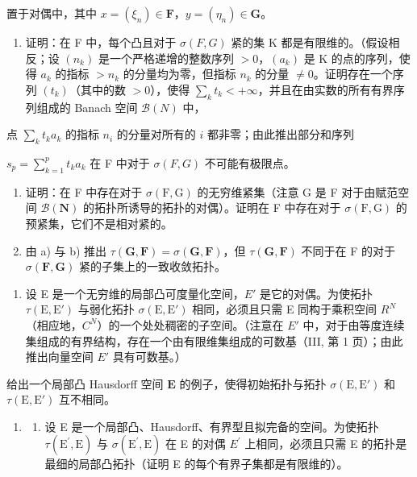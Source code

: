 置于对偶中，其中 \(x = (\xi_n)\in \mathbf{F}\)，\(y = (\eta_{n})\in \mathbf{G}\)。

\begin{enumerate}
\def\labelenumi{\alph{enumi})}
\tightlist
\item
  证明：在 F 中，每个凸且对于 \(\sigma(F, G)\) 紧的集 K 都是有限维的。（假设相反；设 \((n_k)\) 是一个严格递增的整数序列 \(>0\)，\((a_k)\) 是 K 的点的序列，使得 \(a_k\) 的指标 \(>n_k\) 的分量均为零，但指标 \(n_k\) 的分量 \(\neq 0\)。证明存在一个序列 \((t_k)\)（其中的数 \(>0\)），使得 \(\sum_{k} t_k < +\infty\)，并且在由实数的所有有界序列组成的 Banach 空间 \(\mathcal{B}(N)\) 中，
\end{enumerate}

点 \(\sum_{k} t_k a_k\) 的指标 \(n_i\) 的分量对所有的 \(i\) 都非零；由此推出部分和序列

\(s_{p} = \sum_{k=1}^{p} t_k a_k\) 在 F 中对于 \(\sigma(F, G)\) 不可能有极限点。

\begin{enumerate}
\def\labelenumi{\alph{enumi})}
\setcounter{enumi}{1}
\item
  证明：在 F 中存在对于 \(\sigma(\mathrm{F},\mathrm{G})\) 的无穷维紧集（注意 G 是 F 对于由赋范空间 \(\mathcal{B}(\mathbf{N})\) 的拓扑所诱导的拓扑的对偶）。证明在 F 中存在对于 \(\sigma(\mathrm{F},\mathrm{G})\) 的预紧集，它们不是相对紧的。
\item
  由 a) 与 b) 推出 \(\tau(\mathbf{G},\mathbf{F})=\sigma(\mathbf{G},\mathbf{F})\)，但 \(\tau(\mathbf{G},\mathbf{F})\) 不同于在 F 的对于 \(\sigma(\mathbf{F},\mathbf{G})\) 紧的子集上的一致收敛拓扑。
\end{enumerate}

\begin{enumerate}
\def\labelenumi{\arabic{enumi})}
\setcounter{enumi}{7}
\tightlist
\item
  设 E 是一个无穷维的局部凸可度量化空间，\(E'\) 是它的对偶。为使拓扑 \(\tau(\mathrm{E}, \mathrm{E}')\) 与弱化拓扑 \(\sigma(\mathrm{E}, \mathrm{E}')\) 相同，必须且只需 E 同构于乘积空间 \(R^{N}\)（相应地，\(C^{N}\)）的一个处处稠密的子空间。（注意在 \(E'\) 中，对于由等度连续集组成的有界结构，存在一个由有限维集组成的可数基（III, 第 1 页）；由此推出向量空间 \(E'\) 具有可数基。）
\end{enumerate}

给出一个局部凸 Hausdorff 空间 \(\mathbf{E}\) 的例子，使得初始拓扑与拓扑 \(\sigma(\mathrm{E},\mathrm{E}')\) 和 \(\tau(\mathrm{E},\mathrm{E}')\) 互不相同。

\begin{enumerate}
\def\labelenumi{\arabic{enumi})}
\setcounter{enumi}{8}
\tightlist
\item
  \begin{enumerate}
  \def\labelenumii{\alph{enumii})}
  \tightlist
  \item
    设 E 是一个局部凸、Hausdorff、有界型且拟完备的空间。为使拓扑 \(\tau(\mathrm{E}^{\prime},\mathrm{E})\) 与 \(\sigma(\mathrm{E}^{\prime},\mathrm{E})\) 在 E 的对偶 \(E^{\prime}\) 上相同，必须且只需 E 的拓扑是最细的局部凸拓扑（证明 E 的每个有界子集都是有限维的）。
  \end{enumerate}
\end{enumerate}

